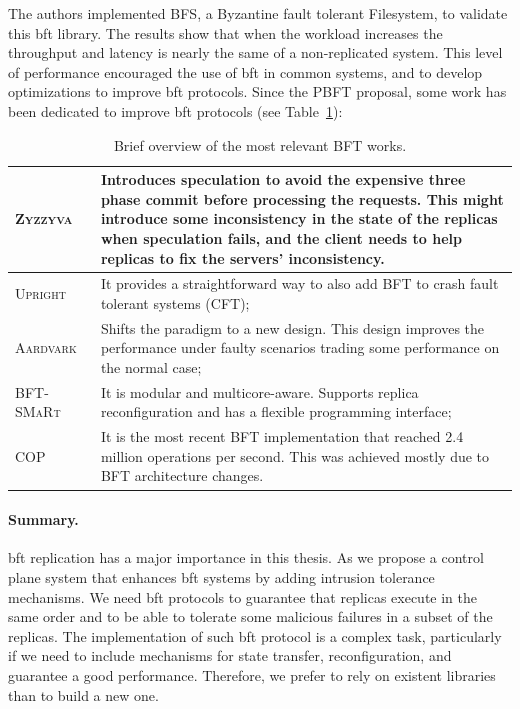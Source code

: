 The authors implemented \textsc{BFS}, a Byzantine fault tolerant Filesystem, to validate this \gls{bft} library. 
The results show that when the workload increases the throughput and latency is nearly the same of a non-replicated system. 
This level of performance encouraged the use of \gls{bft} in common systems, and to develop optimizations to improve \gls{bft} protocols. 
Since the \textsc{PBFT} proposal, some work has been dedicated to improve \gls{bft} protocols (see Table~\ref{tab:bft}):



\begin{table}[h]
\begin{center}
{\footnotesize
\begin{tabular}{ p{2.5cm}  p{10.5cm}  }\hline
\textsc{Zyzzyva}~\cite{Kotla:2010}  & Introduces speculation to avoid the expensive three phase commit before processing the requests. This might introduce some inconsistency in the state of the replicas when speculation fails, and the client needs to help replicas to fix the servers’ inconsistency. \\ \hline			
\textsc{Upright}~\cite{Clement:2009} & It provides a straightforward way to also add BFT to crash fault tolerant systems (CFT); \\ \hline	
\textsc{Aardvark}~\cite{Clement:2009b} & Shifts the paradigm to a new design. This design improves the performance under faulty scenarios trading some performance on the normal case; \\ \hline
\textsc{BFT-SMaRt}~\cite{Bessani:2014} & It is modular and multicore-aware. Supports replica reconfiguration and has a flexible programming interface; \\ \hline
\textsc{COP}~\cite{Behl:2015} & It is the most recent BFT implementation that reached 2.4 million operations per second. This was achieved mostly due to BFT architecture changes.\\  \hline  
\end{tabular}
}
\caption{Brief overview of the most relevant BFT works.}
\label{tab:bft}
\end{center}
\end{table}

\paragraph{Summary.} 
\gls{bft} replication has a major importance in this thesis. 
As we propose a control plane system that enhances \gls{bft} systems by adding intrusion tolerance mechanisms. 
We need \gls{bft} protocols to guarantee that replicas execute in the same order and to be able to tolerate some malicious failures in a subset of the replicas.
The implementation of such \gls{bft} protocol is a complex task, particularly if we need to include mechanisms for state transfer, reconfiguration, and guarantee a good performance.
Therefore, we prefer to rely on existent libraries than to build a new one.



